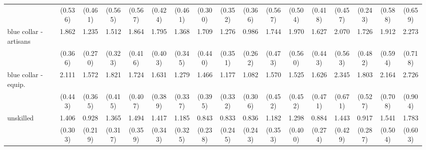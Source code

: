 {\begin{tabular}{l*{16}{c}}
                    &     (0.536)         &     (0.461)         &     (0.565)         &     (0.567)         &     (0.424)         &     (0.461)         &     (0.300)         &     (0.352)         &     (0.366)         &     (0.567)         &     (0.504)         &     (0.418)         &     (0.457)         &     (0.243)         &     (0.588)         &     (0.659)         \\
[1em]
blue collar - artisans&       1.862\sym{**} &       1.235         &       1.512         &       1.864\sym{**} &       1.795\sym{**} &       1.368         &       1.709\sym{*}  &       1.276         &       0.986         &       1.744\sym{*}  &       1.970\sym{*}  &       1.627         &       2.070\sym{**} &       1.726         &       1.912\sym{*}  &       2.273\sym{**} \\
                    &     (0.366)         &     (0.270)         &     (0.323)         &     (0.416)         &     (0.403)         &     (0.345)         &     (0.440)         &     (0.351)         &     (0.262)         &     (0.473)         &     (0.560)         &     (0.443)         &     (0.563)         &     (0.482)         &     (0.594)         &     (0.718)         \\
[1em]
blue collar - equip.&       2.111\sym{***}&       1.572         &       1.821\sym{**} &       1.724\sym{*}  &       1.631\sym{*}  &       1.279         &       1.466         &       1.177         &       1.082         &       1.570         &       1.525         &       1.626         &       2.345\sym{**} &       1.803\sym{*}  &       2.164\sym{*}  &       2.726\sym{**} \\
                    &     (0.443)         &     (0.365)         &     (0.415)         &     (0.407)         &     (0.389)         &     (0.337)         &     (0.395)         &     (0.332)         &     (0.306)         &     (0.452)         &     (0.452)         &     (0.471)         &     (0.671)         &     (0.527)         &     (0.708)         &     (0.904)         \\
[1em]
unskilled           &       1.406         &       0.928         &       1.365         &       1.494         &       1.417         &       1.185         &       0.843         &       0.833         &       0.836         &       1.182         &       1.298         &       0.884         &       1.443         &       0.917         &       1.541         &       1.783         \\
                    &     (0.303)         &     (0.219)         &     (0.317)         &     (0.359)         &     (0.343)         &     (0.325)         &     (0.238)         &     (0.245)         &     (0.243)         &     (0.353)         &     (0.400)         &     (0.274)         &     (0.429)         &     (0.287)         &     (0.504)         &     (0.603)         \\

\end{tabular}}
